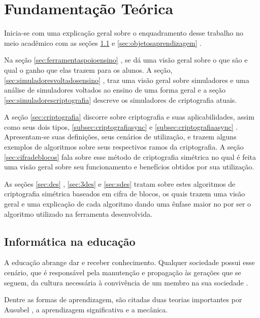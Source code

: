 \chapter{Fundamentação Teórica}
\label{char:fundteorica}
Inicia-se com uma explicação geral sobre o enquadramento desse trabalho no meio acadêmico com as seções \ref{sec:informaticaeducacao}  e \ref{sec:objetosaprendizagem} .
 
Na seção \ref{sec:ferramentaspoioensino} , se dá uma visão geral sobre o que são e qual o ganho que elas trazem para os alunos. A seção, \ref{sec:simuladoresvoltadosensino} , traz uma visão geral sobre simuladores e uma análise de simuladores voltados ao ensino de uma forma geral e a seção \ref{sec:simuladorescriptografia} descreve os simuladores de criptografia atuais.

A seção \ref{sec:criptografia}  discorre sobre criptografia e suas aplicabilidades, assim como seus dois tipos, \ref{subsec:criptografiasync}  e \ref{subsec:criptografiaasync} . Apresentam-se suas definições, seus cenários de utilização, e trazem alguns exemplos de algoritmos sobre seus respectivos ramos da criptografia. A seção \ref{sec:cifradeblocos}  fala sobre esse método de criptografia simétrica no qual é feita uma visão geral sobre seu funcionamento e benefícios obtidos por sua utilização.

As seções \ref{sec:des} , \ref{sec:3des}  e \ref{sec:sdes}  tratam sobre estes algoritmos de criptografia simétrica baseados em cifra de blocos, os quais trazem uma visão geral e uma explicação de cada algoritmo dando uma ênfase maior no  por ser o algoritmo utilizado na ferramenta desenvolvida.

\section{Informática na educação}
\label{sec:informaticaeducacao}
A educação abrange dar e receber conhecimento. Qualquer sociedade possui esse cenário, que é responsável pela manutenção e propagação às gerações que se seguem, da cultura necessária à convivência de um membro na sua sociedade \cite{hamawaki09}.

Dentre as formas de aprendizagem, são citadas duas teorias importantes por Ausubel \cite{ausubel80}, a aprendizagem significativa e a mecânica.

